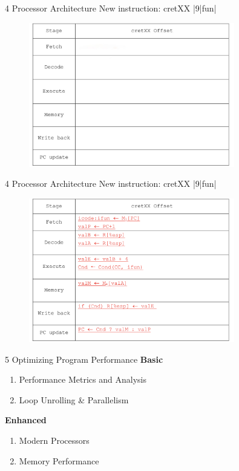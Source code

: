 \documentclass{beamer}
\begin{document}
\begin{frame}{4 Processor Architecture}
	New instruction: cretXX |9|fun|
	\begin{figure}
		\centering
		\includegraphics[width=0.8\textwidth]{figures/4-1-1.jpeg}
	\end{figure}
\end{frame}

\begin{frame}{4 Processor Architecture}
	New instruction: cretXX |9|fun|
	\begin{figure}
		\centering
		\includegraphics[width=0.8\textwidth]{figures/4-1-2.jpeg}
	\end{figure}
\end{frame}

\begin{frame}{5 Optimizing Program Performance}
\textbf{Basic}
\begin{enumerate}
	\item Performance Metrics and Analysis
	\item Loop Unrolling \& Parallelism
\end{enumerate}
\textbf{Enhanced}
\begin{enumerate}
	\item Modern Processors
	\item Memory Performance
\end{enumerate}
\end{frame}
\end{document}
